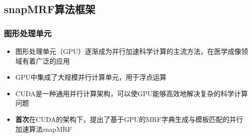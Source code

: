 \documentclass{beamer}
\begin{document}

\subsection{snapMRF算法框架}
\begin{frame}
	\frametitle{图形处理单元}
	\begin{itemize}
		\item 图形处理单元（GPU）逐渐成为并行加速科学计算的主流方法，在医学成像领域有着广泛的应用	
		\item GPU中集成了大规模并行计算单元，用于浮点运算
		\item CUDA是一种通用并行计算架构，可以使GPU能够高效地解决复杂的科学计算问题
		\item \textbf{首次}在CUDA的架构下，提出了基于GPU的MRF字典生成与模板匹配的并行加速算法snapMRF
	\end{itemize}

\end{frame}
\end{document}
